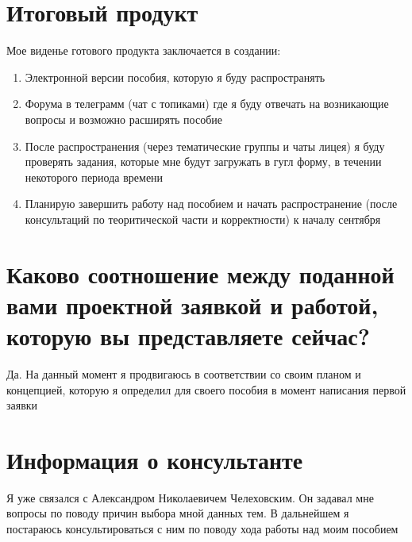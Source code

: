 \section{Итоговый продукт}
Мое виденье готового продукта заключается в создании:
\begin{enumerate}
    \item Электронной версии пособия, которую я буду распространять
    \item Форума в телеграмм (чат с топиками) где я буду отвечать на возникающие вопросы и возможно расширять пособие
    \item После распространения (через тематические группы и чаты лицея) я буду проверять задания, которые мне будут загружать в гугл форму, в течении некоторого периода времени
    \item Планирую завершить работу над пособием и начать распространение (после консультаций по теоритической части
    и корректности) к началу сентября
\end{enumerate}
    
\section{Каково соотношение между поданной вами проектной заявкой и работой, которую вы представляете сейчас?}
    Да. На данный момент я продвигаюсь в соответствии со своим планом и концепцией, которую я определил для своего 
    пособия в момент написания первой заявки
    
\section{Информация о консультанте}
    Я уже связался с Александром Николаевичем Челеховским. Он задавал мне вопросы по поводу причин выбора мной данных
    тем. В дальнейшем я
    постараюсь консультироваться с ним по поводу хода работы над моим пособием
    

